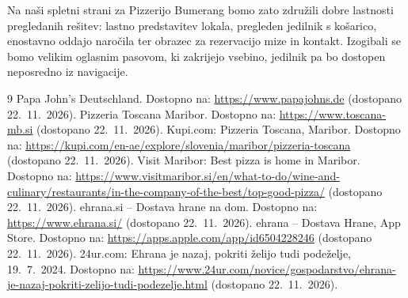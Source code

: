 \documentclass[12pt,a4paper]{article}
\begin{document}
Na naši spletni strani za Pizzerijo Bumerang bomo zato združili dobre lastnosti
pregledanih rešitev: lastno predstavitev lokala, pregleden jedilnik s
košarico, enostavno oddajo naročila ter obrazec za rezervacijo mize in
kontakt. Izogibali se bomo velikim oglasnim pasovom, ki zakrijejo vsebino,
jedilnik pa bo dostopen neposredno iz navigacije.

\begin{thebibliography}{9}
 Papa John's Deutschland. Dostopno na:
  \url{https://www.papajohns.de} (dostopano 22.~11.~2026).
 Pizzeria Toscana Maribor. Dostopno na:
  \url{https://www.toscana-mb.si} (dostopano 22.~11.~2026).
 Kupi.com: Pizzeria Toscana, Maribor. Dostopno na:
  \url{https://kupi.com/en-ae/explore/slovenia/maribor/pizzeria-toscana}
  (dostopano 22.~11.~2026).
 Visit Maribor: Best pizza is home in Maribor. Dostopno na:
  \url{https://www.visitmaribor.si/en/what-to-do/wine-and-culinary/restaurants/in-the-company-of-the-best/top-good-pizza/}
  (dostopano 22.~11.~2026).
 ehrana.si -- Dostava hrane na dom. Dostopno na:
  \url{https://www.ehrana.si/} (dostopano 22.~11.~2026).
 ehrana -- Dostava Hrane, App Store. Dostopno na:
  \url{https://apps.apple.com/app/id6504228246} (dostopano 22.~11.~2026).
 24ur.com: Ehrana je nazaj, pokriti želijo tudi
  podeželje, 19.~7.~2024. Dostopno na:
  \url{https://www.24ur.com/novice/gospodarstvo/ehrana-je-nazaj-pokriti-zelijo-tudi-podezelje.html}
  (dostopano 22.~11.~2026).
\end{thebibliography}
\end{document}
